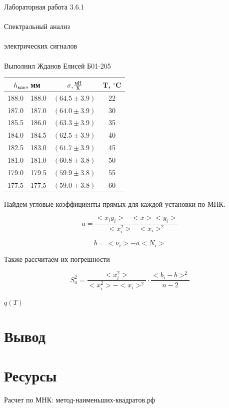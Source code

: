\documentclass{astroedu-lab}
\begin{document}
\begin{problem}{\huge Лабораторная работа 3.6.1\\\\Спектральный анализ\\\\электрических сигналов\\\\Выполнил Жданов Елисей Б01-205}
\begin{center}
\begin{tabular}{|c|c|c|c|}
\hline 
\multicolumn{2}{|c|}{$h_\text{ман}$, мм} & $\sigma, \frac{\text{мН}}{\text{К}}$ & T, $^\circ$C \\
\hline
188.0 & 188.0 & $(64.5 \pm 3.9)$ & 22\\
187.0 & 187.0 & $(64.0 \pm 3.9)$ & 30\\
185.5 & 186.0 & $(63.3 \pm 3.9)$ & 35\\
184.0 & 184.5 & $(62.5 \pm 3.9)$ & 40\\
182.5 & 183.0 & $(61.7 \pm 3.9)$ & 45\\
181.0 & 181.0 & $(60.8 \pm 3.8)$ & 50\\
179.0 & 179.5 & $(59.9 \pm 3.8)$ & 55\\
177.5 & 177.5 & $(59.0 \pm 3.8)$ & 60\\
\hline
\end{tabular}
\end{center}


Найдем угловые коэффициенты прямых для каждой установки по МНК.

\[
	a = \frac{<x_i y_i> - < x > < y_i >}{< x_i^2> - < x_i >^2}
\]

\[
	b = < \nu_i > - a < N_i >
\]

Также рассчитаем их погрешности

\begin{equation}
	S_a^2 = \frac{< x_i^2>}{< x_i^2 > - < x_i >^2} \cdot \frac{<  b_i - b > ^2}{n - 2}
\end{equation}


\begin{center}
	\Large $q(T)$
\end{center}

\section{Вывод}


\section{Ресурсы}

Расчет по МНК: метод-наименьших-квадратов.рф


\end{problem}
\end{document}
